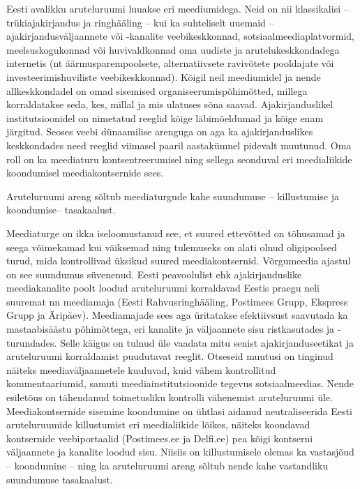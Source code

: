 \documentclass[estonian,]{article}
\begin{document}
Eesti avalikku aruteluruumi luuakse eri meediumidega. Neid on nii klassikalisi -- trükiajakirjandus ja ringhääling -- kui ka suhteliselt uuemaid -- ajakirjandusväljaannete või -kanalite veebikeskkonnad, sotsiaalmeediaplatvormid, meelsuskogukonnad või huvivaldkonnad oma uudiste ja arutelukeskkondadega internetis (nt äärmusparempoolsete, alternatiivsete ravivõtete pooldajate või investeerimishuviliste veebikeskkonnad). Kõigil neil meediumidel ja nende allkeskkondadel on omad sisemised organiseerumispõhimõtted, millega korraldatakse seda, kes, millal ja mis ulatuses sõna saavad. Ajakirjanduslikel institutsioonidel on nimetatud reeglid kõige läbimõeldumad ja kõige enam järgitud. Seoses veebi dünaamilise arenguga on aga ka ajakirjanduslikes keskkondades need reeglid viimasel paaril aastakümnel pidevalt muutunud. Oma roll on ka meediaturu kontsentreerumisel ning sellega seonduval eri meedialiikide koondumisel meediakontsernide sees.

\begin{blockquote-right}
Aruteluruumi areng sõltub meediaturgude kahe suundumuse -- killustumise
ja koondumise-- tasakaalust.
\end{blockquote-right}

Meediaturge on ikka iseloomustanud see, et suured ettevõtted on tõhusamad ja seega võimekamad kui väiksemad ning tulemuseks on alati olnud oligipoolsed turud, mida kontrollivad üksikud suured meediakontsernid. Võrgumeedia ajastul on see suundumus süvenenud. Eesti peavoolulist ehk ajakirjanduslike meediakanalite poolt loodud aruteluruumi korraldavad Eestis praegu neli suuremat nn meediamaja (Eesti Rahvusringhääling, Postimees Grupp, Ekspress Grupp ja Äripäev). Meediamajade sees aga üritatakse efektiivsust saavutada ka mastaabisäästu põhimõttega, eri kanalite ja väljaannete sisu ristkasutades ja -turundades. Selle käigus on tulnud üle vaadata mitu senist ajakirjanduseetikat ja aruteluruumi korraldamist puudutavat reeglit. Otseseid muutusi on tinginud näiteks meediaväljaannetele kuuluvad, kuid vähem kontrollitud kommentaariumid, samuti meediainstitutsioonide tegevus sotsiaalmeedias. Nende esiletõus on tähendanud toimetusliku kontrolli vähenemist aruteluruumi üle. Meediakontsernide sisemine koondumine on ühtlasi aidanud neutraliseerida Eesti aruteluruumide killustumist eri meedialiikide lõikes, näiteks koondavad kontsernide veebiportaalid (Postimees.ee ja Delfi.ee) pea kõigi kontserni väljaannete ja kanalite loodud sisu. Niisiis on killustumisele olemas ka vastasjõud -- koondumine -- ning ka aruteluruumi areng sõltub nende kahe vastandliku suundumuse tasakaalust.
\end{document}

